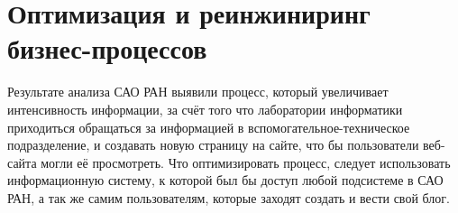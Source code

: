 \section{Оптимизация и реинжиниринг бизнес-процессов}

Результате анализа САО РАН выявили процесс, который увеличивает интенсивность информации, за счёт того что лаборатории информатики приходиться обращаться за информацией в вспомогательное-техническое подразделение, и создавать новую страницу на сайте, что бы пользователи веб-сайта могли её просмотреть. Что оптимизировать процесс, следует использовать информационную систему, к которой был бы доступ любой подсистеме в САО РАН, а так же самим пользователям, которые заходят создать и вести свой блог.
\pagebreak